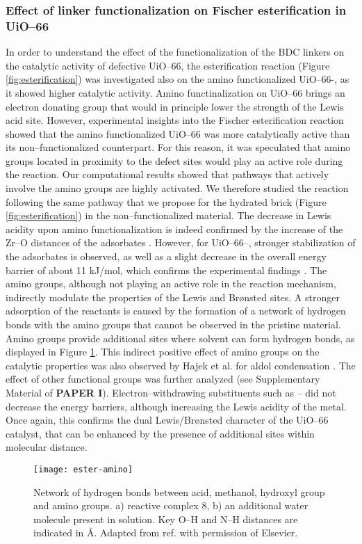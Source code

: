 \subsubsection*{Effect of linker functionalization on Fischer esterification in UiO--66}
In order to understand the effect of the functionalization of the BDC linkers on the catalytic activity of defective UiO--66, the esterification reaction (Figure \ref{fig:esterification}) was investigated also on the amino functionalized UiO--66-, as it showed higher catalytic activity. Amino functinalization on UiO--66 brings an electron donating group that would in principle lower the strength of the Lewis acid site. However, experimental insights into the Fischer esterification reaction showed that the amino functionalized UiO--66 was more catalytically active than its non--functionalized counterpart. For this reason, it was speculated that amino groups located in proximity to the defect sites would play an active role during the reaction. Our computational results showed that pathways that actively involve the amino groups are highly activated. We therefore studied the reaction following the same pathway that we propose for the hydrated brick (Figure \ref{fig:esterification}) in the non--functionalized material.
\npar
The decrease in Lewis acidity upon amino functionalization is indeed confirmed by the increase of the Zr--O distances of the adsorbates \cite{vermoortele2012electronic}. However, for UiO--66--, stronger stabilization of the adsorbates is observed, as well as a slight decrease in the overall energy barrier of about 11 kJ/mol, which confirms the experimental findings \cite{cirujano2015conversion, cirujano2015zirconium}. The amino groups, although not playing an active role in the reaction mechanism, indirectly modulate the properties of the Lewis and Br\o{}nsted sites. A stronger adsorption of the reactants is caused by the formation of a network of hydrogen bonds with the amino groups that cannot be observed in the pristine material. Amino groups provide additional sites where solvent can form hydrogen bonds, as displayed in Figure \ref{fig:ester-amino}. This indirect positive effect of amino groups on the catalytic properties was also observed by Hajek et al. for aldol condensation \cite{vandichel2015active}. The effect of other functional groups was further analyzed (see Supplementary Material of \textbf{PAPER I}). Electron--withdrawing substituents such as -- did not decrease the energy barriers, although increasing the Lewis acidity of the metal. Once again, this confirms the dual Lewis/Br\o{}nsted character of the UiO--66 catalyst, that can be enhanced by the presence of additional sites within molecular distance. 
\begin{figure}[!htbp]
	\centering
	\texttt{[image: ester-amino]}
	\caption{Network of hydrogen bonds between acid, methanol, hydroxyl group and amino groups. a) reactive complex 8, b) an additional water molecule present in solution. Key O--H and N--H distances are indicated in \AA. Adapted from ref. \cite{caratelli2017nature} with permission of Elsevier.}
	\label{fig:ester-amino}
\end{figure}

